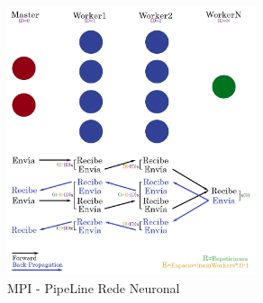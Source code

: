 	
	\begin{figure}[!h]
		\centering
		\includegraphics[width=0.65\textwidth]{images/chapter_3/redneu_mpi2}
		\caption{MPI - PipeLine Rede Neuronal}
		\label{fig:redneumpipipe}
	\end{figure}
	
